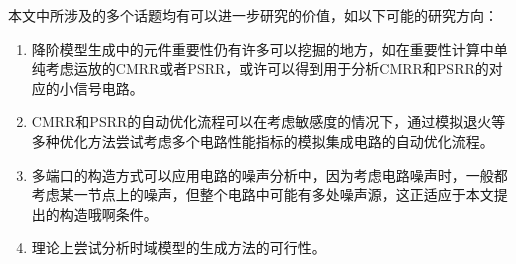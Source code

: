 本文中所涉及的多个话题均有可以进一步研究的价值，如以下可能的研究方向：

\begin{enumerate}[label=\emph{\alph*})]
	\item 降阶模型生成中的元件重要性仍有许多可以挖掘的地方，如在重要性计算中单纯考虑运放的CMRR或者PSRR，或许可以得到用于分析CMRR和PSRR的对应的小信号电路。
	\item CMRR和PSRR的自动优化流程可以在考虑敏感度的情况下，通过模拟退火等多种优化方法尝试考虑多个电路性能指标的模拟集成电路的自动优化流程。
	\item 多端口的构造方式可以应用电路的噪声分析中，因为考虑电路噪声时，一般都考虑某一节点上的噪声，但整个电路中可能有多处噪声源，这正适应于本文提出的构造哦啊条件。
	\item 理论上尝试分析时域模型的生成方法的可行性。
\end{enumerate}